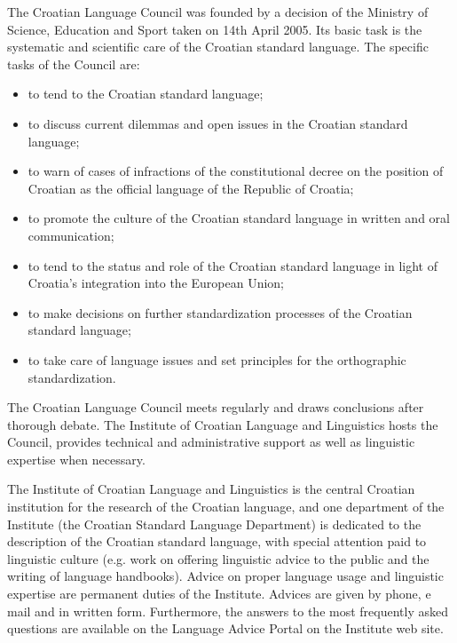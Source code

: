 \begin{multicols}{2}
The Croatian Language Council was founded by a decision of the Ministry of Science, Education and Sport taken on 14th April 2005. Its basic task is the systematic and scientific care of the Croatian standard language. The specific tasks of the Council are:

\begin{itemize}
\item to tend to the Croatian standard language;
\item to discuss current dilemmas and open issues in the Croatian standard language;
\item to warn of cases of infractions of the constitutional decree on the position of Croatian as the official language of the Republic of Croatia;
\item to promote the culture of the Croatian standard language in written and oral communication;
\item to tend to the status and role of the Croatian standard language in light of Croatia’s integration into the European Union;
\item to make decisions on further standardization processes of the Croatian standard language;
\item to take care of language issues and set principles for the orthographic standardization.
\end{itemize}

The Croatian Language Council meets regularly and draws conclusions after thorough debate. The Institute of Croatian Language and Linguistics hosts the Council, provides technical and administrative support as well as linguistic expertise when necessary.

The Institute of Croatian Language and Linguistics \cite{str7} is the central Croatian institution for the research of the Croatian language, and one department of the Institute (the Croatian Standard Language Department) is dedicated to the description of the Croatian standard language, with special attention paid to linguistic culture (e.g. work on offering linguistic advice to the public and the writing of language handbooks). Advice on proper language usage and linguistic expertise are permanent duties of the Institute. Advices are given by phone, e mail and in written form. Furthermore, the answers to the most frequently asked questions are available on the Language Advice Portal \cite{str8} on the Institute web site.



\end{multicols}
